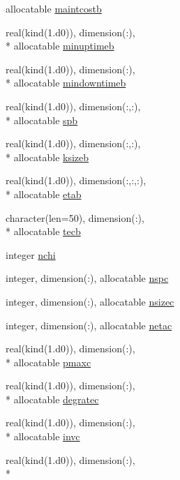 \begin{DoxyCompactItemize}
allocatable \hyperlink{classinputvar_a7af239451cf6d5494b2dec7d873ffa53}{maintcostb}
\item 
real(kind(1.d0)), dimension(\-:), \\*
allocatable \hyperlink{classinputvar_a84de543a9e5ef22ff5f0fc9e0cce8b32}{minuptimeb}
\item 
real(kind(1.d0)), dimension(\-:), \\*
allocatable \hyperlink{classinputvar_a09eb64b393df82105b2d57d6ed03b939}{mindowntimeb}
\item 
real(kind(1.d0)), dimension(\-:,\-:), \\*
allocatable \hyperlink{classinputvar_a831b2b0adb9e0bddc327d353012788e0}{spb}
\item 
real(kind(1.d0)), dimension(\-:,\-:), \\*
allocatable \hyperlink{classinputvar_ad8be82d5fedb76e97006462fc334ee95}{ksizeb}
\item 
real(kind(1.d0)), dimension(\-:,\-:,\-:), \\*
allocatable \hyperlink{classinputvar_ac19333b401f362c7b0ed89ec10590872}{etab}
\item 
character(len=50), dimension(\-:), \\*
allocatable \hyperlink{classinputvar_ab2486a625a1ff1aaf70cb9e38d8c07db}{tecb}
\item 
integer \hyperlink{classinputvar_ac34eff504af528e971c7174dfcb39028}{nchi}
\item 
integer, dimension(\-:), allocatable \hyperlink{classinputvar_aad6ce13b0378ba79e193cb3738e2d938}{nspc}
\item 
integer, dimension(\-:), allocatable \hyperlink{classinputvar_af28da5ec88564638bee476f2a37f5308}{nsizec}
\item 
integer, dimension(\-:), allocatable \hyperlink{classinputvar_ad9998f4f97f100bf6294fb8fa083bfe7}{netac}
\item 
real(kind(1.d0)), dimension(\-:), \\*
allocatable \hyperlink{classinputvar_a59b745ef4d38979ee6715cbbdd3b7fdc}{pmaxc}
\item 
real(kind(1.d0)), dimension(\-:), \\*
allocatable \hyperlink{classinputvar_a60a72e191c29f7558641179db3a7fd65}{degratec}
\item 
real(kind(1.d0)), dimension(\-:), \\*
allocatable \hyperlink{classinputvar_ad241283eadb6335a2d955ba6d30cffb6}{invc}
\item 
real(kind(1.d0)), dimension(\-:), \\*

\end{DoxyCompactItemize}
